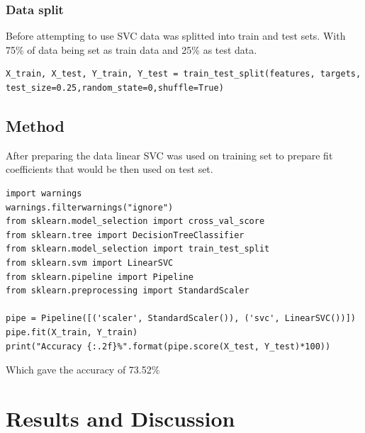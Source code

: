 	\subsection{Data split}
	Before attempting to use SVC data was splitted into train and test sets. With 75\% of data being set as train data and 25\% as test data.
\begin{verbatim}
X_train, X_test, Y_train, Y_test = train_test_split(features, targets, test_size=0.25,random_state=0,shuffle=True)
\end{verbatim}
	
	\section{Method}
	After preparing the data linear SVC was used on training set to prepare fit coefficients that would be then used on test set.
\begin{verbatim}
import warnings
warnings.filterwarnings("ignore")
from sklearn.model_selection import cross_val_score
from sklearn.tree import DecisionTreeClassifier
from sklearn.model_selection import train_test_split
from sklearn.svm import LinearSVC
from sklearn.pipeline import Pipeline
from sklearn.preprocessing import StandardScaler

pipe = Pipeline([('scaler', StandardScaler()), ('svc', LinearSVC())])
pipe.fit(X_train, Y_train)
print("Accuracy {:.2f}%".format(pipe.score(X_test, Y_test)*100))
\end{verbatim}

Which gave the accuracy of 73.52\%
\chapter{Results and Discussion}
	 
